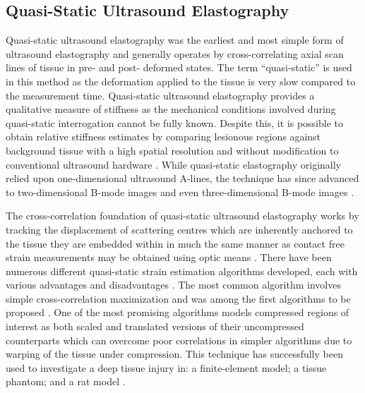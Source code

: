 		\subsection{Quasi-Static Ultrasound Elastography}
			Quasi-static ultrasound elastography was the earliest and most simple form of ultrasound elastography \cite{dickinson82,wilson82} and generally operates by cross-correlating axial scan lines of tissue in pre- and post- deformed states. The term ``quasi-static'' is used in this method as the deformation applied to the tissue is very slow compared to the measurement time. Quasi-static ultrasound elastography provides a qualitative measure of stiffness as the mechanical conditions involved during quasi-static interrogation cannot be fully known. Despite this, it is possible to obtain relative stiffness estimates by comparing lesionous regions against background tissue with a high spatial resolution and without modification to conventional ultrasound hardware \cite{chen96,treece11}. While quasi-static elastography originally relied upon one-dimensional ultrasound A-lines, the technique has since advanced to two-dimensional B-mode images \cite{ophir91} and even three-dimensional B-mode images \cite{deprez07,deprez09}.

			The cross-correlation foundation of quasi-static ultrasound elastography works by tracking the displacement of scattering centres which are inherently anchored to the tissue they are embedded within \cite{meunier95,vargheese09} in much the same manner as contact free strain measurements may be obtained using optic means \cite{austrell}. There have been numerous different quasi-static strain estimation algorithms developed, each with various advantages and disadvantages \cite{treece11}. The most common algorithm involves simple cross-correlation maximization and was among the first algorithms to be proposed \cite{ophir91}. One of the most promising algorithms models compressed regions of interest as both scaled and translated versions of their uncompressed counterparts \cite{brusseau00,brusseau08} which can overcome poor correlations in simpler algorithms due to warping of the tissue under compression. This technique has successfully been used to investigate a deep tissue injury in: a finite-element model; a tissue phantom; and a rat model \cite{deprez11}.


